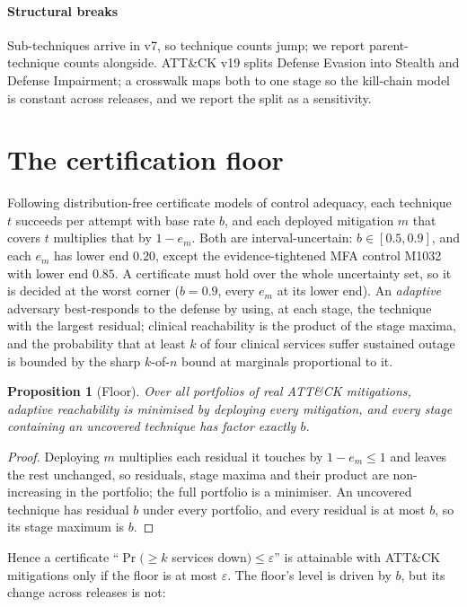 \documentclass[conference,compsoc]{IEEEtran}
\newtheorem{proposition}{Proposition}
\begin{document}
\paragraph{Structural breaks} Sub-techniques arrive in v7, so technique counts jump; we
report parent-technique counts alongside. ATT\&CK v19 splits Defense Evasion into
Stealth and Defense Impairment; a crosswalk maps both to one stage so the kill-chain
model is constant across releases, and we report the split as a sensitivity.

\section{The certification floor}
Following distribution-free certificate models of control adequacy, each technique $t$ succeeds per attempt with base
rate $b$, and each deployed mitigation $m$ that covers $t$ multiplies that by $1-e_m$.
Both are interval-uncertain: $b\in[0.5,0.9]$, and each $e_m$ has lower end $0.20$,
except the evidence-tightened MFA control M1032 with lower end $0.85$. A certificate must
hold over the whole uncertainty set, so it is decided at the worst corner ($b=0.9$,
every $e_m$ at its lower end). An \emph{adaptive} adversary best-responds to the defense
by using, at each stage, the technique with the largest residual; clinical reachability
is the product of the \GapStages{} stage maxima, and the probability that at least $k$
of four clinical services suffer sustained outage is bounded by the sharp $k$-of-$n$
bound at marginals proportional to it.

\begin{proposition}[Floor]\label{prop:floor}
Over all portfolios of real ATT\&CK mitigations, adaptive reachability is minimised by
deploying every mitigation, and every stage containing an uncovered technique has
factor exactly $b$.
\end{proposition}
\begin{proof}
Deploying $m$ multiplies each residual it touches by $1-e_m\le 1$ and leaves the rest
unchanged, so residuals, stage maxima and their product are non-increasing in the
portfolio; the full portfolio is a minimiser. An uncovered technique has residual $b$
under every portfolio, and every residual is at most $b$, so its stage maximum is $b$.
\end{proof}

Hence a certificate ``$\Pr(\ge k$ services down$)\le\varepsilon$'' is attainable with
ATT\&CK mitigations only if the floor is at most $\varepsilon$. The floor's level is
driven by $b$, but its change across releases is not:
\end{document}
